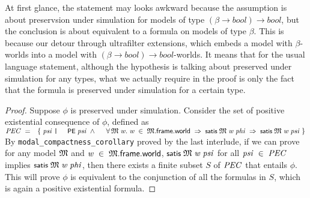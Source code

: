 \documentclass[letterpaper]{article}
\renewcommand{\HOLConst}[1]{{\textsf{\upshape\small #1}}}
\renewcommand{\HOLinline}[1]{\ensuremath{#1}}
\begin{document}
At first glance, the statement may looks awkward because the assumption is about preservsion under simulation for models of type $(\beta\to bool)\to bool$, but the conclusion is about equivalent to a formula on models of type $\beta$. This is because our detour through ultrafilter extensions, which embeds a model with $\beta$-worlds into a model with $(\beta\to bool)\to bool$-worlds. It means that for the usual language statement, although the hypothesis is talking about preserved under simulation for any types, what we actually require in the proof is only the fact that the formula is preserved under simulation for a certain type.
\begin{proof}
  Suppose $\phi$ is preserved under simulation. Consider the set of positive existential consequence of $\phi$, defined as \HOLinline{\HOLFreeVar{PEC}\;\HOLSymConst{=}\\
\;\;\HOLTokenLeftbrace{}\HOLBoundVar{psi}\;\HOLTokenBar{}\\
\;\;\;\;\;\HOLConst{PE}\;\HOLBoundVar{psi}\;\HOLSymConst{\HOLTokenConj{}}\\
\;\;\;\;\;\HOLSymConst{\HOLTokenForall{}}\HOLBoundVar{\ensuremath{\mathfrak{M}}}\;\HOLBoundVar{w}.\;\HOLBoundVar{w}\;\HOLSymConst{\HOLTokenIn{}}\;\HOLBoundVar{\ensuremath{\mathfrak{M}}}.\HOLFieldName{frame}.\HOLFieldName{world}\;\HOLSymConst{\HOLTokenImp{}}\;\HOLConst{satis}\;\HOLBoundVar{\ensuremath{\mathfrak{M}}}\;\HOLBoundVar{w}\;\HOLFreeVar{phi}\;\HOLSymConst{\HOLTokenImp{}}\;\HOLConst{satis}\;\HOLBoundVar{\ensuremath{\mathfrak{M}}}\;\HOLBoundVar{w}\;\HOLBoundVar{psi}\HOLTokenRightbrace{}}
By \texttt{modal_compactness_corollary} proved by the last interlude, if we can prove for any model \HOLinline{\HOLFreeVar{\ensuremath{\mathfrak{M}}}} and \HOLinline{\HOLFreeVar{w}\;\HOLSymConst{\HOLTokenIn{}}\;\HOLFreeVar{\ensuremath{\mathfrak{M}}}.\HOLFieldName{frame}.\HOLFieldName{world}}, \HOLinline{\HOLConst{satis}\;\HOLFreeVar{\ensuremath{\mathfrak{M}}}\;\HOLFreeVar{w}\;\HOLFreeVar{psi}} for all \HOLinline{\HOLFreeVar{psi}\;\HOLSymConst{\HOLTokenIn{}}\;\HOLFreeVar{PEC}} implies \HOLinline{\HOLConst{satis}\;\HOLFreeVar{\ensuremath{\mathfrak{M}}}\;\HOLFreeVar{w}\;\HOLFreeVar{phi}}, then there exists a finite subset $S$ of \HOLinline{\HOLFreeVar{PEC}} that entails $\phi$. This will prove $\phi$ is equivalent to the conjunction of all the formulas in $S$, which is again a positive existential formula.


\end{proof}
\end{document}
